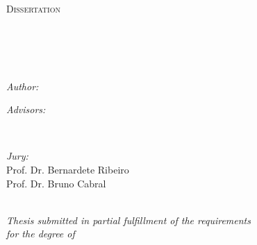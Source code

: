\documentclass[11pt, a4paper, oneside]{thesis} %
\newcommand\blankpage{%
    \null
    \thispagestyle{empty}%
    \addtocounter{page}{-1}%
    \newpage}
\begin{document}
\afterpage{\blankpage}
\clearpage %
\begin{titlepage}
\begin{center}

\textsc{\LARGE \univname}\\[1.5cm] %
\textsc{\Large Dissertation}\\[0.5cm] %
\textsc{}\\[0.5cm] %

\HRule \\[0.4cm] %
{\huge \bfseries \ttitle}\\[0.4cm] %
\HRule \\[1.5cm] %
 
\begin{minipage}{0.4\textwidth}
\begin{flushleft} \large
\emph{Author:}\\
\authornames %
\end{flushleft}
\end{minipage}
\begin{minipage}{0.5\textwidth}
\begin{flushright} \large
\emph{Advisors:} \\
\supname %
\end{flushright}
\end{minipage}\\[0.5cm]

\begin{minipage}{0.90\textwidth}
\begin{flushright} \large
\emph{Jury:} \\
Prof. Dr. Bernardete Ribeiro \\ Prof. Dr. Bruno Cabral 
\end{flushright}
\end{minipage}\\[1cm]
 
\large \textit{Thesis submitted in partial fulfillment of the requirements\\ for the degree of \degreename}\\[0.3cm] %


\end{center}
\end{titlepage}
\end{document}

